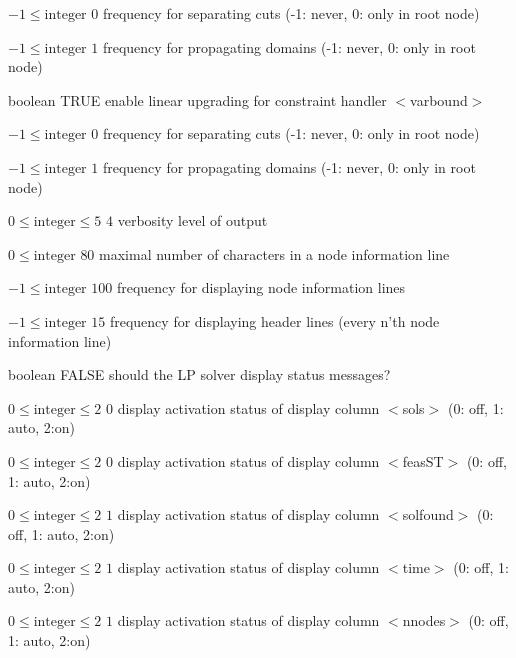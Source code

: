 %
{$-1\leq\textrm{integer}$}%
{$0$}%
{frequency for separating cuts (-1: never, 0: only in root node)}%
{}

%
{$-1\leq\textrm{integer}$}%
{$1$}%
{frequency for propagating domains (-1: never, 0: only in root node)}%
{}

%
{boolean}%
{TRUE}%
{enable linear upgrading for constraint handler $<$varbound$>$}%
{}

%
{$-1\leq\textrm{integer}$}%
{$0$}%
{frequency for separating cuts (-1: never, 0: only in root node)}%
{}

%
{$-1\leq\textrm{integer}$}%
{$1$}%
{frequency for propagating domains (-1: never, 0: only in root node)}%
{}

%
{$0\leq\textrm{integer}\leq5$}%
{$4$}%
{verbosity level of output}%
{}

%
{$0\leq\textrm{integer}$}%
{$80$}%
{maximal number of characters in a node information line}%
{}

%
{$-1\leq\textrm{integer}$}%
{$100$}%
{frequency for displaying node information lines}%
{}

%
{$-1\leq\textrm{integer}$}%
{$15$}%
{frequency for displaying header lines (every n'th node information line)}%
{}

%
{boolean}%
{FALSE}%
{should the LP solver display status messages?}%
{}

%
{$0\leq\textrm{integer}\leq2$}%
{$0$}%
{display activation status of display column $<$sols$>$ (0: off, 1: auto, 2:on)}%
{}

%
{$0\leq\textrm{integer}\leq2$}%
{$0$}%
{display activation status of display column $<$feasST$>$ (0: off, 1: auto, 2:on)}%
{}

%
{$0\leq\textrm{integer}\leq2$}%
{$1$}%
{display activation status of display column $<$solfound$>$ (0: off, 1: auto, 2:on)}%
{}

%
{$0\leq\textrm{integer}\leq2$}%
{$1$}%
{display activation status of display column $<$time$>$ (0: off, 1: auto, 2:on)}%
{}

%
{$0\leq\textrm{integer}\leq2$}%
{$1$}%
{display activation status of display column $<$nnodes$>$ (0: off, 1: auto, 2:on)}%
{}

